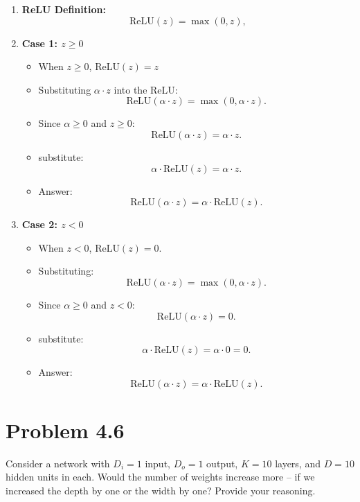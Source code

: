 \documentclass[10pt]{article}
\begin{document}
\vspace{2em}
\begin{enumerate}
    \item \textbf{ReLU Definition:} 
    \[
\text{ReLU}(z) = \max(0, z),
\]
    \item \textbf{Case 1: \( z \geq 0 \)}
    \begin{itemize}
        \item When \( z \geq 0 \),  \( \text{ReLU}(z) = z \)
        \item Substituting \( \alpha \cdot z \) into the ReLU:
        \[
        \text{ReLU}(\alpha \cdot z) = \max(0, \alpha \cdot z).
        \]
        \item Since \( \alpha \geq 0 \) and \( z \geq 0 \):
        \[
        \text{ReLU}(\alpha \cdot z) = \alpha \cdot z.
        \]
        \item substitute:
        \[
        \alpha \cdot \text{ReLU}(z) = \alpha \cdot z.
        \]
        \item Answer:
        \[
        \text{ReLU}(\alpha \cdot z) = \alpha \cdot \text{ReLU}(z).
        \]
    \end{itemize}

    \item \textbf{Case 2: \( z < 0 \)}
    \begin{itemize}
        \item When \( z < 0 \), \( \text{ReLU}(z) = 0 \).
        \item Substituting:
        \[
        \text{ReLU}(\alpha \cdot z) = \max(0, \alpha \cdot z).
        \]
        \item Since \( \alpha \geq 0 \) and \( z < 0 \):
        \[
        \text{ReLU}(\alpha \cdot z) = 0.
        \]
        \item substitute:
        \[
        \alpha \cdot \text{ReLU}(z) = \alpha \cdot 0 = 0.
        \]
        \item Answer:
        \[
        \text{ReLU}(\alpha \cdot z) = \alpha \cdot \text{ReLU}(z).
        \]
    \end{itemize}
    \end{enumerate}
    
\section*{Problem 4.6}
 
Consider a network with $D_i = 1$ input, $D_o = 1$ output, $K = 10$ layers, and $D = 10$ hidden units in each. Would the number of weights increase more -- if we increased the depth by one or the width by one? Provide your reasoning.
\end{document}
